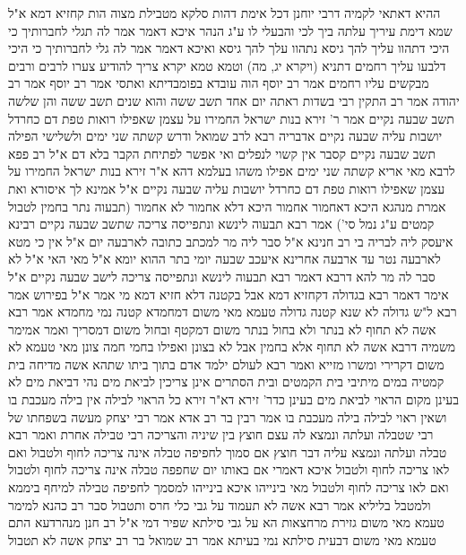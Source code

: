\documentclass[12pt, openany]{book}
\begin{document}
{ההיא דאתאי לקמיה דרבי יוחנן דכל אימת דהות סלקא מטבילת מצוה הות קחזיא דמא א"ל שמא דימת עיריך עלתה ביך לכי והבעלי לו ע"ג הנהר 
איכא דאמר אמר לה תגלי לחברותיך כי היכי דתהוו עליך להך גיסא נתהוו עלך להך גיסא ואיכא דאמר אמר לה גלי לחברותיך כי היכי דלבעו עליך רחמים דתניא (ויקרא יג, מה) וטמא טמא יקרא צריך להודיע צערו לרבים ורבים מבקשים עליו רחמים 
אמר רב יוסף הוה עובדא בפומבדיתא ואתסי 
אמר רב יוסף אמר רב יהודה אמר רב התקין רבי בשדות ראתה יום אחד תשב ששה והוא
שנים תשב ששה והן שלשה תשב שבעה נקיים 
אמר ר' זירא בנות ישראל החמירו על עצמן שאפילו רואות טפת דם כחרדל יושבות עליה שבעה נקיים 
אדבריה רבא לרב שמואל ודרש קשתה שני ימים ולשלישי הפילה תשב שבעה נקיים קסבר אין קשוי לנפלים ואי אפשר לפתיחת הקבר בלא דם 
א"ל רב פפא לרבא מאי אריא קשתה שני ימים אפילו משהו בעלמא דהא א"ר זירא בנות ישראל החמירו על עצמן שאפילו רואות טפת דם כחרדל יושבות עליה שבעה נקיים 
א"ל אמינא לך איסורא ואת אמרת מנהגא היכא דאחמור אחמור היכא דלא אחמור לא אחמור 
(תבעוה נתר בחמין לטבול קמטים ע"ג נמל סי') אמר רבא תבעוה לינשא ונתפייסה צריכה שתשב שבעה נקיים 
רבינא איעסק ליה לבריה בי רב חנינא א"ל סבר ליה מר למכתב כתובה לארבעה יום א"ל אין כי מטא לארבעה נטר עד ארבעה אחרינא איעכב שבעה יומי בתר ההוא יומא 
א"ל מאי האי א"ל לא סבר לה מר להא דרבא דאמר רבא תבעוה לינשא ונתפייסה צריכה לישב שבעה נקיים א"ל אימר דאמר רבא בגדולה דקחזיא דמא אבל בקטנה דלא חזיא דמא מי אמר 
א"ל בפירוש אמר רבא ל"ש גדולה לא שנא קטנה גדולה טעמא מאי משום דמחמדא קטנה נמי מחמדא 
אמר רבא אשה
לא תחוף לא בנתר ולא בחול בנתר משום דמקטף ובחול משום דמסריך 
ואמר אמימר משמיה דרבא אשה לא תחוף אלא בחמין אבל לא בצונן ואפילו בחמי חמה צונן מאי טעמא לא משום דקרירי ומשרו מזייא 
ואמר רבא לעולם ילמד אדם בתוך ביתו שתהא אשה מדיחה בית קמטיה במים מיתיבי בית הקמטים ובית הסתרים אינן צריכין לביאת מים 
נהי דביאת מים לא בעינן מקום הראוי לביאת מים בעינן כדר' זירא דא"ר זירא כל הראוי לבילה אין בילה מעכבת בו ושאין ראוי לבילה בילה מעכבת בו 
אמר רבין בר רב אדא אמר רבי יצחק מעשה בשפחתו של רבי שטבלה ועלתה ונמצא לה עצם חוצץ בין שיניה והצריכה רבי טבילה אחרת 
ואמר רבא טבלה ועלתה ונמצא עליה דבר חוצץ אם סמוך לחפיפה טבלה אינה צריכה לחוף ולטבול ואם לאו צריכה לחוף ולטבול 
איכא דאמרי אם באותו יום שחפפה טבלה אינה צריכה לחוף ולטבול ואם לאו צריכה לחוף ולטבול 
מאי בינייהו איכא בינייהו למסמך לחפיפה טבילה למיחף ביממא ולמטבל בליליא 
אמר רבא אשה לא תעמוד על גבי כלי חרס ותטבול סבר רב כהנא למימר טעמא מאי משום גזירת מרחצאות הא על גבי סילתא שפיר דמי 
א"ל רב חנן מנהרדעא התם טעמא מאי משום דבעית סילתא נמי בעיתא 
אמר רב שמואל בר רב יצחק אשה לא תטבול}
\end{document}
